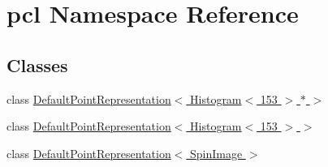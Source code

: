 \hypertarget{namespacepcl}{}\section{pcl Namespace Reference}
\label{namespacepcl}
\subsection*{Classes}
\begin{DoxyCompactItemize}
\item 
class \hyperlink{classpcl_1_1_default_point_representation_3_01_histogram_3_01153_01_4_01_5_01_4}{Default\+Point\+Representation$<$ Histogram$<$ 153 $>$ $\ast$ $>$}
\item 
class \hyperlink{classpcl_1_1_default_point_representation_3_01_histogram_3_01153_01_4_01_4}{Default\+Point\+Representation$<$ Histogram$<$ 153 $>$ $>$}
\item 
class \hyperlink{classpcl_1_1_default_point_representation_3_01_spin_image_01_4}{Default\+Point\+Representation$<$ Spin\+Image $>$}
\end{DoxyCompactItemize}
